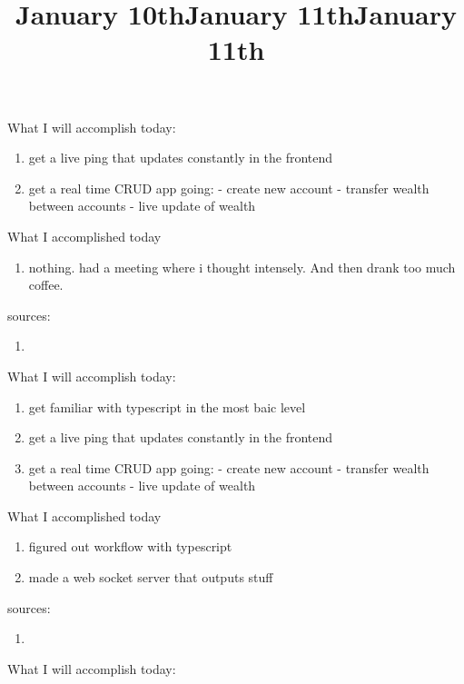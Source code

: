 \title{January 10th}

What I will accomplish today:

\begin{enumerate}
	\item get a live ping that updates constantly in the frontend
	\item get a real time CRUD app going:
		- create new account
		- transfer wealth between accounts
		- live update of wealth
\end{enumerate}

What I accomplished today

\begin{enumerate}
	\item nothing. had a meeting where i thought intensely. And then drank too much coffee.
\end{enumerate}

sources:

\begin{enumerate}
	\item 
\end{enumerate}


\title{January 11th}

What I will accomplish today:

\begin{enumerate}
	\item get familiar with typescript in the most baic level
	\item get a live ping that updates constantly in the frontend
	\item get a real time CRUD app going:
		- create new account
		- transfer wealth between accounts
		- live update of wealth
\end{enumerate}

What I accomplished today

\begin{enumerate}
	\item figured out workflow with typescript
	\item made a web socket server that outputs stuff 
\end{enumerate}

sources:

\begin{enumerate}
	\item 
\end{enumerate}

\title{January 11th}

What I will accomplish today:

